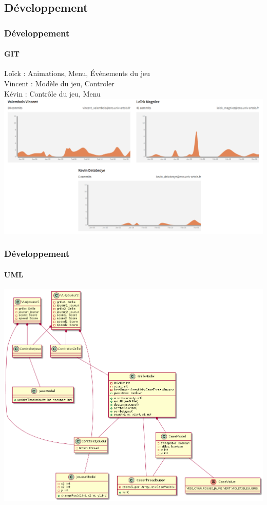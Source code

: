 \documentclass{beamer}
\begin{document}
\begin{darkframes}
 \section{Développement}
 \begin{frame}
 	 \frametitle{Développement}
 	 \begin{center}
 	 \framesubtitle{GIT}
 	 	Loïck : Animations, Menu, Événements du jeu \\%
 	 	Vincent : Modèle du jeu, Controler \\%
		Kévin : Contrôle du jeu, Menu \\%
 	 	
		\includegraphics[scale=0.40]{./Image/git.png}
		\end{center}
    \end{frame}
    
     \begin{frame}
 	 \frametitle{Développement}
 	 \begin{center}
 	 \framesubtitle{UML}
 	 \includegraphics[scale=0.25]{./Image/diagramFinal.png}
		

\end{center}
\end{frame}
\end{darkframes}
\end{document}
